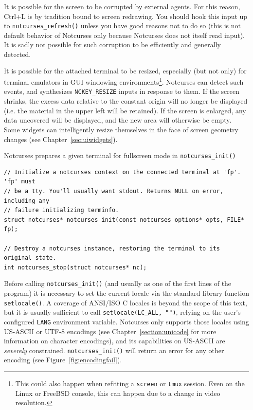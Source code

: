 \documentclass[letterpaper,10pt]{article}
\begin{document}
It is possible for the screen to be corrupted by external agents. For this
reason, Ctrl+L is by tradition bound to screen redrawing. You should hook this
input up to \texttt{notcurses\_refresh()} unless you have good reasons not to
do so (this is not default behavior of Notcurses only because Notcurses does
not itself read input). It is sadly not possible for such corruption to be
efficiently and generally detected.

It is possible for the attached terminal to be resized, especially (but not
only) for terminal emulators in GUI windowing environments\footnote{This could
also happen when refitting a \texttt{screen} or \texttt{tmux} session.
Even on the Linux or FreeBSD console, this can happen due to a change in video
resolution.}. Notcurses can detect such events, and synthesizes
\texttt{NCKEY\_RESIZE} inputs in response to them. If the screen shrinks, the
excess data relative to the constant origin will no longer be displayed (i.e.
the material in the upper left will be retained). If the screen is enlarged,
any data uncovered will be displayed, and the new area will otherwise be empty.
Some widgets can intelligently resize themselves in the face of screen
geometry changes (see Chapter~\ref{sec:uiwidgets}).

Notcurses prepares a given terminal for fullscreen mode in \texttt{notcurses\_init()}

\begin{listing}[!htbp]
\begin{verbatim}
// Initialize a notcurses context on the connected terminal at 'fp'. 'fp' must
// be a tty. You'll usually want stdout. Returns NULL on error, including any
// failure initializing terminfo.
struct notcurses* notcurses_init(const notcurses_options* opts, FILE* fp);

// Destroy a notcurses instance, restoring the terminal to its original state.
int notcurses_stop(struct notcurses* nc);
\end{verbatim}
\end{listing}

Before calling \texttt{notcurses\_init()} (and usually as one of the first lines
of the program) it is necessary to set the current locale via the standard
library function \texttt{setlocale()}. A coverage of ANSI/ISO C locales is beyond
the scope of this text, but it is usually sufficient to call
\texttt{setlocale(LC\_ALL, "")}, relying on the user's configured \texttt{LANG}
environment variable. Notcurses only supports those locales using
US-ASCII or UTF-8 encodings (see Chapter~\ref{section:unicode} for more
information on character encodings), and its capabilities on US-ASCII
are \textit{severely} constrained. \texttt{notcurses\_init()} will return an
error for any other encoding (see Figure~\ref{fig:encodingfail}).
\end{document}
